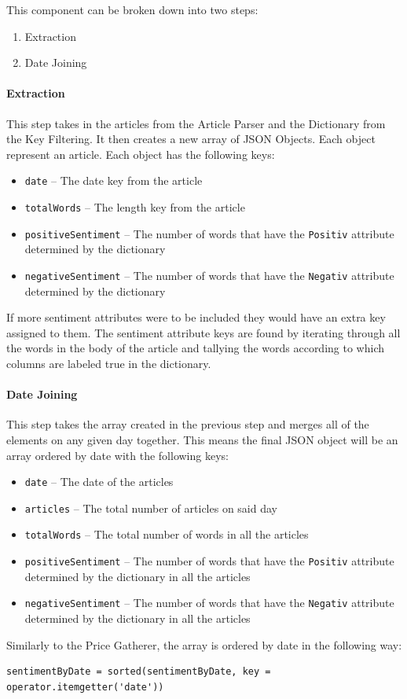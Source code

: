 This component can be broken down into two steps:
\begin{enumerate}
    \item Extraction
    \item Date Joining
\end{enumerate}

\paragraph{Extraction}

This step takes in the articles from the Article Parser and the Dictionary from the Key Filtering. It then creates a new array of JSON Objects. Each object represent an article. Each object has the following keys:
\begin{itemize}
    \item \texttt{date} -- The date key from the article
    \item \texttt{totalWords} -- The length key from the article
    \item \texttt{positiveSentiment} -- The number of words that have the \verb|Positiv| attribute determined by the dictionary
    \item \texttt{negativeSentiment} -- The number of words that have the \verb|Negativ| attribute determined by the dictionary
\end{itemize}
If more sentiment attributes were to be included they would have an extra key assigned to them. The sentiment attribute keys are found by iterating through all the words in the body of the article and tallying the words according to which columns are labeled true in the dictionary.

\paragraph{Date Joining}

This step takes the array created in the previous step and merges all of the elements on any given day together. This means the final JSON object will be an array ordered by date with the following keys:
\begin{itemize}
    \item \texttt{date} -- The date of the articles
    \item \texttt{articles} -- The total number of articles on said day
    \item \texttt{totalWords} -- The total number of words in all the articles
    \item \texttt{positiveSentiment} -- The number of words that have the \verb|Positiv| attribute determined by the dictionary in all the articles
    \item \texttt{negativeSentiment} -- The number of words that have the \verb|Negativ| attribute determined by the dictionary in all the articles
\end{itemize}
Similarly to the Price Gatherer, the array is ordered by date in the following way:
\begin{lstlisting}[caption=JSON Array Ordered by Date]
sentimentByDate = sorted(sentimentByDate, key = operator.itemgetter('date'))
\end{lstlisting}

